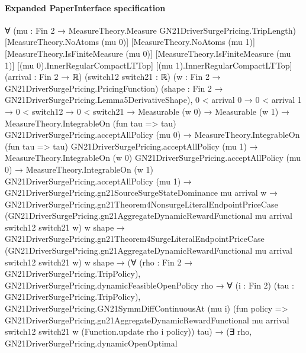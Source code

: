 \documentclass[10pt]{article}
\begin{document}
\paragraph{Expanded PaperInterface specification}
\begin{ReviewVerbatim}
∀ (mu : Fin 2 → MeasureTheory.Measure GN21DriverSurgePricing.TripLength) [MeasureTheory.NoAtoms (mu 0)]
  [MeasureTheory.NoAtoms (mu 1)] [MeasureTheory.IsFiniteMeasure (mu 0)] [MeasureTheory.IsFiniteMeasure (mu 1)]
  [(mu 0).InnerRegularCompactLTTop] [(mu 1).InnerRegularCompactLTTop] (arrival : Fin 2 → ℝ) (switch12 switch21 : ℝ)
  (w : Fin 2 → GN21DriverSurgePricing.PricingFunction) (shape : Fin 2 → GN21DriverSurgePricing.Lemma5DerivativeShape),
  0 < arrival 0 →
    0 < arrival 1 →
      0 < switch12 →
        0 < switch21 →
          Measurable (w 0) →
            Measurable (w 1) →
              MeasureTheory.IntegrableOn (fun tau => tau) GN21DriverSurgePricing.acceptAllPolicy (mu 0) →
                MeasureTheory.IntegrableOn (fun tau => tau) GN21DriverSurgePricing.acceptAllPolicy (mu 1) →
                  MeasureTheory.IntegrableOn (w 0) GN21DriverSurgePricing.acceptAllPolicy (mu 0) →
                    MeasureTheory.IntegrableOn (w 1) GN21DriverSurgePricing.acceptAllPolicy (mu 1) →
                      GN21DriverSurgePricing.gn21SourceSurgeStateDominance mu arrival w →
                        GN21DriverSurgePricing.gn21Theorem4NonsurgeLiteralEndpointPriceCase
                            (GN21DriverSurgePricing.gn21AggregateDynamicRewardFunctional mu arrival switch12 switch21 w)
                            w shape →
                          GN21DriverSurgePricing.gn21Theorem4SurgeLiteralEndpointPriceCase
                              (GN21DriverSurgePricing.gn21AggregateDynamicRewardFunctional mu arrival switch12 switch21
                                w)
                              w shape →
                            (∀ (rho : Fin 2 → GN21DriverSurgePricing.TripPolicy),
                                GN21DriverSurgePricing.dynamicFeasibleOpenPolicy rho →
                                  ∀ (i : Fin 2) (tau : GN21DriverSurgePricing.TripPolicy),
                                    GN21DriverSurgePricing.GN21SymmDiffContinuousAt (mu i)
                                      (fun policy =>
                                        GN21DriverSurgePricing.gn21AggregateDynamicRewardFunctional mu arrival switch12
                                          switch21 w (Function.update rho i policy))
                                      tau) →
                              (∃ rho,
                                  GN21DriverSurgePricing.dynamicOpenOptimal

\end{ReviewVerbatim}
\end{document}

